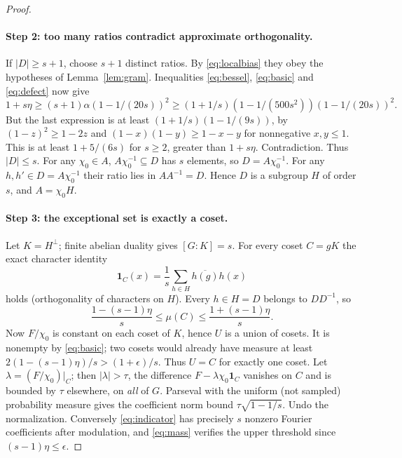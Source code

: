 \documentclass[11pt]{article}
\theoremstyle{definition}\newtheorem{remark}[theorem]{Remark}
\newcommand{\ind}{\mathbf 1}
\begin{document}
\begin{proof}
\paragraph{Step 2: too many ratios contradict approximate orthogonality.}
If $|D|\ge s+1$, choose $s+1$ distinct ratios. By \eqref{eq:localbias} they obey the hypotheses of Lemma~\ref{lem:gram}. Inequalities \eqref{eq:bessel}, \eqref{eq:basic} and \eqref{eq:defect} now give
\begin{equation}\label{eq:contra}
 1+s\eta\ge(s+1)\alpha(1-1/(20s))^2
 \ge (1+1/s)(1-1/(500s^2))(1-1/(20s))^2.
\end{equation}
But the last expression is at least $(1+1/s)(1-1/(9s))$, by $(1-z)^2\ge1-2z$ and $(1-x)(1-y)\ge1-x-y$ for nonnegative $x,y\le1$. This is at least $1+5/(6s)$ for $s\ge2$, greater than $1+s\eta$. Contradiction. Thus $|D|\le s$. For any $\chi_0\in A$, $A\chi_0^{-1}\subseteq D$ has $s$ elements, so $D=A\chi_0^{-1}$. For any $h,h'\in D=A\chi_0^{-1}$ their ratio lies in $AA^{-1}=D$. Hence $D$ is a subgroup $H$ of order $s$, and $A=\chi_0H$.

\paragraph{Step 3: the exceptional set is exactly a coset.}
Let $K=H^\perp$; finite abelian duality gives $[G:K]=s$. For every coset $C=gK$ the exact character identity
\begin{equation}\label{eq:indicator}
 \ind_C(x)=\frac1s\sum_{h\in H}\overline{h(g)}h(x)
\end{equation}
holds (orthogonality of characters on $H$). Every $h\in H=D$ belongs to $DD^{-1}$, so
\begin{equation}\label{eq:mass}
 \frac{1-(s-1)\eta}{s}\le\mu(C)\le\frac{1+(s-1)\eta}{s}.
\end{equation}
Now $F/\chi_0$ is constant on each coset of $K$, hence $U$ is a union of cosets. It is nonempty by \eqref{eq:basic}; two cosets would already have measure at least $2(1-(s-1)\eta)/s>(1+\epsilon)/s$. Thus $U=C$ for exactly one coset. Let $\lambda=(F/\chi_0)|_C$; then $|\lambda|>\tau$, the difference $F-\lambda\chi_0\ind_C$ vanishes on $C$ and is bounded by $\tau$ elsewhere, on \emph{all} of $G$. Parseval with the uniform (not sampled) probability measure gives the coefficient norm bound $\tau\sqrt{1-1/s}$. Undo the normalization. Conversely \eqref{eq:indicator} has precisely $s$ nonzero Fourier coefficients after modulation, and \eqref{eq:mass} verifies the upper threshold since $(s-1)\eta\le\epsilon$.
\end{proof}
\end{document}
